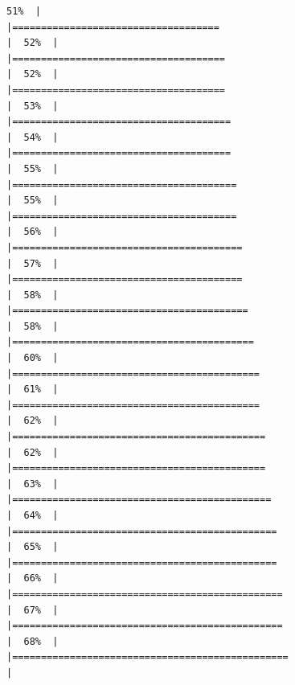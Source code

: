 \documentclass[
  english,
  man,a4paper,mask,floatsintext]{apa6}
\begin{document}
\begin{verbatim}
51%  |                                                                              |====================================                                  |  52%  |                                                                              |=====================================                                 |  52%  |                                                                              |=====================================                                 |  53%  |                                                                              |======================================                                |  54%  |                                                                              |======================================                                |  55%  |                                                                              |=======================================                               |  55%  |                                                                              |=======================================                               |  56%  |                                                                              |========================================                              |  57%  |                                                                              |========================================                              |  58%  |                                                                              |=========================================                             |  58%  |                                                                              |==========================================                            |  60%  |                                                                              |===========================================                           |  61%  |                                                                              |===========================================                           |  62%  |                                                                              |============================================                          |  62%  |                                                                              |============================================                          |  63%  |                                                                              |=============================================                         |  64%  |                                                                              |==============================================                        |  65%  |                                                                              |==============================================                        |  66%  |                                                                              |===============================================                       |  67%  |                                                                              |===============================================                       |  68%  |                                                                              |================================================                      |  
\end{verbatim}
\end{document}
